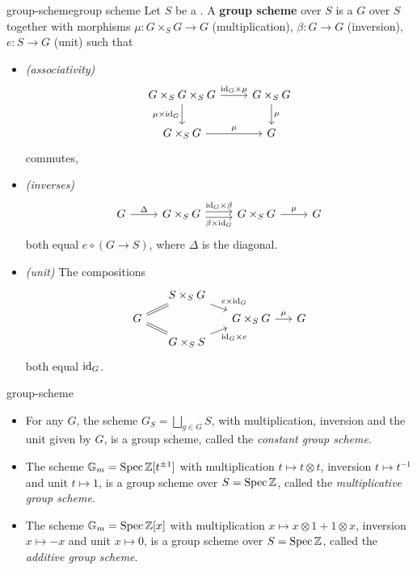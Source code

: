\begin{topic}{group-scheme}{group scheme}
    Let $S$ be a . A \textbf{group scheme} over $S$ is a  $G$ over $S$ together with morphisms $\mu : G \times_S G \to G$ (multiplication), $\beta : G \to G$ (inversion), $e : S \to G$ (unit) such that
    \begin{itemize}
        \item \textit{(associativity)}
        \[ \begin{tikzcd}
            G \times_S G \times_S G \arrow{r}{\id_G \times \mu} \arrow[swap]{d}{\mu \times \id_G} & G \times_S G \arrow{d}{\mu} \\ G \times_S G \arrow{r}{\mu} & G
        \end{tikzcd} \]
        commutes,
        \item \textit{(inverses)}
        \[ \begin{tikzcd} G \arrow{r}{\Delta} & G \times_S G \arrow[shift left=0.25em]{r}{\id_G \times \beta} \arrow[swap, shift right=0.25em]{r}{\beta \times \id_G} & G \times_S G \arrow{r}{\mu} & G \end{tikzcd} \]
        both equal $e \circ (G \to S)$, where $\Delta$ is the diagonal.
        \item \textit{(unit)} The compositions
        \[ \begin{tikzcd}[row sep=0.5em, column sep=1.5em] & S \times_S G \arrow{dr}{e \times \id_G} & & \\ G \arrow[equal]{ur} \arrow[equal]{dr} & & G \times_S G \arrow{r}{\mu} & G \\ & G \times_S S \arrow[swap]{ur}{\id_G \times e} & & \end{tikzcd} \]
        both equal $\textup{id}_G$.
    \end{itemize}
\end{topic}

\begin{example}{group-scheme}
    \begin{itemize}
        \item For any  $G$, the scheme $G_S = \bigsqcup_{g \in G} S$, with multiplication, inversion and the unit given by $G$, is a group scheme, called the \textit{constant group scheme}.
        \item The scheme $\mathbb{G}_m = \operatorname{Spec} \mathbb{Z}[t^{\pm 1}]$ with multiplication $t \mapsto t \otimes t$, inversion $t \mapsto t^{-1}$ and unit $t \mapsto 1$, is a group scheme over $S = \operatorname{Spec} \mathbb{Z}$, called the \textit{multiplicative group scheme}.
        \item The scheme $\mathbb{G}_m = \operatorname{Spec} \mathbb{Z}[x]$ with multiplication $x \mapsto x \otimes 1 + 1 \otimes x$, inversion $x \mapsto -x$ and unit $x \mapsto 0$, is a group scheme over $S = \operatorname{Spec} \mathbb{Z}$, called the \textit{additive group scheme}.
    \end{itemize}
\end{example}

